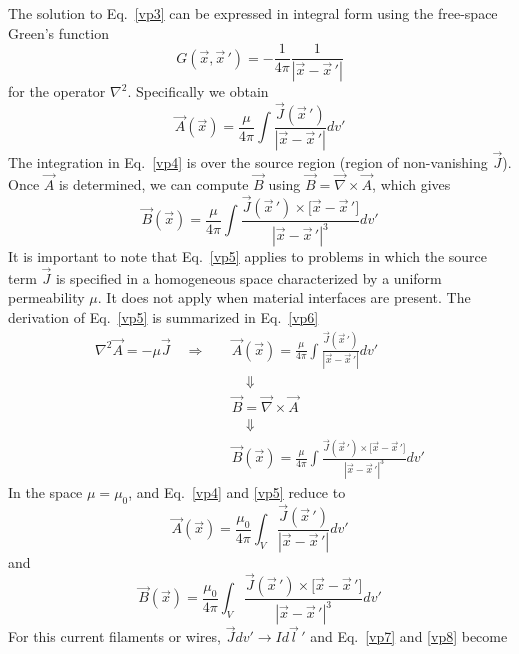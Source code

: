 \documentclass[11pt,a4paper,oneside]{book}
\numberwithin{equation}{section}
\newcommand{\abs}[1]{\left|#1\right|}
\theoremstyle{it}
\theoremstyle{definition}
\begin{document}
The solution to Eq.~\eqref{vp3} can be expressed in integral form using the free-space Green's function $$ G(\vec{x},\vec{x}\,')=-\frac{1}{4\pi}\frac{1}{\abs{\vec{x}-\vec{x}\,'}}$$  for the operator $\nabla^2$. Specifically we obtain  
\begin{equation}\label{vp4}
\vec{A}(\vec{x}) = \frac{\mu}{4\pi}\int\frac{\vec{J}(\vec{x}\,')}{\abs{\vec{x}-\vec{x}\,'}}dv'
\end{equation}
The integration in Eq.~\eqref{vp4} is over the source region (region of non-vanishing $\vec{J}$). Once $\vec{A}$ is determined, we can compute $\vec{B}$ using $\vec{B}=\vec{\nabla}\times\vec{A}$, which gives
\begin{equation}\label{vp5}
	\vec{B}(\vec{x}) = \frac{\mu}{4\pi}\int\frac{\vec{J}(\vec{x}\,')\times\big[\vec{x}-\vec{x}\,'\big]}{\abs{\vec{x}-\vec{x}\,'}^3}dv'
\end{equation}
It is important to note that Eq.~\eqref{vp5} applies to problems in which the source term $\vec{J}$ is specified in a homogeneous space characterized by a uniform permeability $\mu$. It does not apply when material interfaces are present. The derivation of Eq.~\eqref{vp5} is summarized in Eq.~\eqref{vp6}
\begin{equation}\label{vp6}
\begin{aligned}
	\boxed{\nabla^2\vec{A}=-\mu\vec{J}}\quad\Rightarrow\quad&
	\boxed{	\vec{A}(\vec{x}) = \frac{\mu}{4\pi}\int\frac{\vec{J}(\vec{x}\,')}{\abs{\vec{x}-\vec{x}\,'}}dv'} \\[6pt]
	&\quad\Downarrow \\[6pt]
	&\boxed{\vec{B}=\vec{\nabla}\times\vec{A}} \\[6pt]
	&\quad\Downarrow \\[6pt]
	&\boxed{\vec{B}(\vec{x}) = \frac{\mu}{4\pi}\int \frac{\vec{J}(\vec{x}\,')\times\big[\vec{x}-\vec{x}\,'\big]}{\abs{\vec{x}-\vec{x}\,'}^3}dv'}
\end{aligned}
\end{equation}
In the space $\mu=\mu_0$, and Eq.~\eqref{vp4} and \ref{vp5} reduce to 
\begin{equation}\label{vp7}
	\vec{A}(\vec{x}) = \frac{\mu_0}{4\pi}\int_{V}\frac{\vec{J}(\vec{x}\,')}{\abs{\vec{x}-\vec{x}\,'}}dv'
\end{equation}
and
\begin{equation}\label{vp8}
	\vec{B}(\vec{x}) = \frac{\mu_0}{4\pi}\int_{V}\frac{\vec{J}(\vec{x}\,')\times\big[\vec{x}-\vec{x}\,'\big]}{\abs{\vec{x}-\vec{x}\,'}^3}dv'
\end{equation}
For this current filaments or wires, $\vec{J}dv'\rightarrow Id\vec{l}\,'$ and Eq.~\eqref{vp7} and \ref{vp8} become
\end{document}
